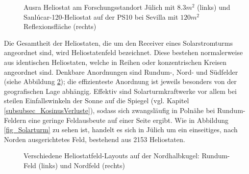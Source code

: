 \begin{figure}[h!]
    \centering
    \setlength{\fboxsep}{1pt}
    \setlength{\fboxrule}{1pt}
\caption[Ausra Heliostat am Forschungsstandort Jülich mit $8.3m^2$  und Sanlúcar-120-Heliostat auf der PS10 bei Sevilla mit $120m^2$ Reflexionsfläche]{Ausra Heliostat am Forschungsstandort Jülich mit $8.3m^2$  (links) und Sanlúcar-120-Heliostat auf der PS10 bei Sevilla mit $120m^2$ Reflexionsfläche (rechts) \cite[S.13]{DissBelhomme}}
    \label{fig_DarstellungHeliostat}
\end{figure}

Die Gesamtheit der Heliostaten, die um den Receiver eines Solarstromturms angeordnet sind, wird Heliostatenfeld bezeichnet.
Diese bestehen normalerweise aus identischen Heliostaten, welche in Reihen oder konzentrischen Kreisen angeordnet sind.
Denkbare Anordnungen sind Rundum-, Nord- und Südfelder (siehe Abbildung \ref{fig_AnordnungHeliostatfeld}); die effizienteste Anordnung ist jeweils besonders von der geografischen Lage abhängig.
Effektiv sind Solarturmkraftwerke vor allem bei steilen Einfallswinkeln der Sonne auf die Spiegel (vgl. Kapitel \ref{subsubsec_KosinusVerluste}), sodass sich zwangsläufig in Polnähe bei Rundum-Feldern eine geringe Feldausbeute auf einer Seite ergibt.
Wie in Abbildung \ref{fig_Solarturm} zu sehen ist, handelt es sich in Jülich um ein einseitiges, nach Norden ausgerichtetes Feld, bestehend aus 2153 Heliostaten.

\begin{figure}[h!]
    \centering
    \setlength{\fboxsep}{1pt}
    \setlength{\fboxrule}{1pt}
\caption[Verschiedene Heliostatfeld-Layouts auf der Nordhalbkugel: Rundum-Feld und Nordfeld]{Verschiedene Heliostatfeld-Layouts auf der Nordhalbkugel: Rundum-Feld (links) und Nordfeld (rechts) \cite[S.14]{DissBelhomme}}
    \label{fig_AnordnungHeliostatfeld}
\end{figure}

